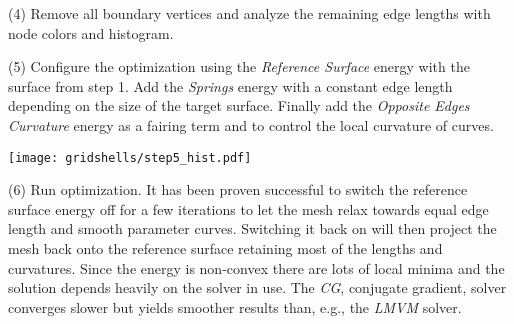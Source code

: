 \documentclass[Thesis.tex]{subfiles}
\begin{document}
\begin{compactenum}[(1)]
\item[(4)] Remove all boundary vertices and analyze the remaining edge lengths with node colors and histogram.

\begin{center}
\begin{minipage}{\linewidth}
            \centering
\end{minipage}
\end{center}   

\item[(5)] Configure the optimization using the \emph{Reference Surface} energy with the surface from step 1. Add the \emph{Springs} energy with a constant edge length depending on the size of the target surface. Finally add the \emph{Opposite Edges Curvature} energy as a fairing term and to control the local curvature of curves.

\begin{center}
\begin{minipage}{\linewidth}
            \centering
            \texttt{[image: gridshells/step5\_hist.pdf]}   
\end{minipage}
\end{center}   

\item[(6)] Run optimization. It has been proven successful to switch the reference surface energy off for a few iterations to let the mesh relax towards equal edge length and smooth parameter curves. Switching it back on will then project the mesh back onto the reference surface retaining most of the lengths and curvatures. Since the energy is non-convex there are lots of local minima and the solution depends heavily on the solver in use. The \emph{CG}, conjugate gradient, solver converges slower but yields smoother results than, e.g., the \emph{LMVM} solver.

\end{compactenum}

\subfilebibliography
\end{document}
